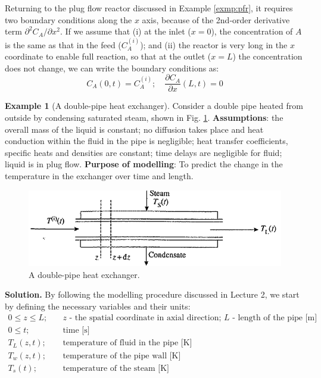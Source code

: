 \documentclass[a4paper,11pt]{article}
\theoremstyle{definition}
\newtheorem{exmp}{Example}[section]
\begin{document}
Returning to the plug flow reactor discussed in Example \ref{exmp:pfr}, it requires two boundary conditions along
the $x$ axis, because of the 2nd-order derivative term $\partial^2 C_A / \partial x^2$.
If we assume that (i) at the inlet ($x=0$), the concentration of $A$ is the same as that in the feed ($C_A^{(i)}$);
and (ii) the reactor is very long in the $x$ coordinate to enable full reaction, so that at the outlet ($x=L$)
the concentration does not change, we can write the boundary conditions as:
\[ C_A(0, t) = C_A^{(i)}; \quad \frac{\partial C_A}{\partial x} (L, t) = 0 \]


\begin{exmp}[A double-pipe heat exchanger]
\label{exmp:heat_exchg}
Consider a double pipe heated from outside by condensing saturated steam, shown in Fig. \ref{fig:heat_exchg}.
\textbf{Assumptions}: the overall mass of the liquid is constant; no diffusion takes place and heat conduction within the fluid
in the pipe is negligible; heat transfer coefficients, specific heats and densities are constant; time delays are negligible for fluid;
liquid is in plug flow. \textbf{Purpose of modelling}: To predict the change in the temperature in the exchanger over time and length.

\begin{figure} [!h]
 \begin{center}
	\includegraphics[width=.7\textwidth]{heat_exchg}
 \end{center}
 \caption{A double-pipe heat exchanger.} 
 \label{fig:heat_exchg}
\end{figure}

\noindent \textbf{Solution.} By following the modelling procedure discussed in Lecture 2,
we start by defining the necessary variables and their units:
\begin{align}
	0 \leq z \leq L; \quad &\textrm{$z$ - the spatial coordinate in axial direction; $L$ - length of the pipe [m]} \nonumber \\
	0 \leq t; \quad &\textrm{time [s]} \nonumber \\
	T_L(z, t); \quad &\textrm{temperature of fluid in the pipe [K]} \nonumber \\
	T_w(z, t); \quad &\textrm{temperature of the pipe wall [K]} \nonumber \\
	T_s(t); \quad &\textrm{temperature of the steam [K]} \nonumber 
\end{align}


\end{exmp}
\end{document}
